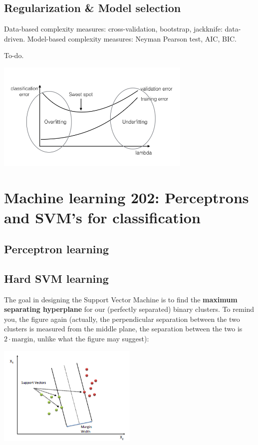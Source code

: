 \documentclass{article}
\begin{document}
\subsection{Regularization \& Model selection}
Data-based complexity measures: cross-validation, bootstrap, jackknife: data-driven. Model-based complexity measures: Neyman Pearson test, AIC, BIC.

To-do.


\includegraphics[width=0.7\textwidth]{underoverfit.png}











\newpage
\section{Machine learning 202: Perceptrons and SVM's for classification}
\subsection{Perceptron learning}

\subsection{Hard SVM learning}
The goal in designing the Support Vector Machine is to find the \textbf{maximum separating hyperplane} for our (perfectly separated) binary clusters. To remind you, the figure again (actually, the perpendicular separation between the two clusters is measured from the middle plane, the separation between the two is $2\cdot\text{margin}$, unlike what the figure may suggest):
\begin{center}\includegraphics[width=0.5\textwidth]{SVM.png}\end{center}
\end{document}
